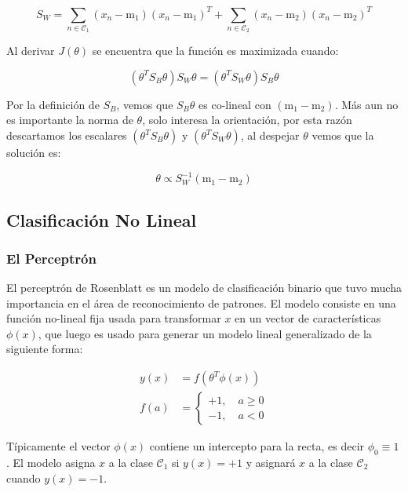 \begin{equation}
    S_W = \sum_{n\in \mathcal{C}_1}(x_n-\text{m}_1)(x_n-\text{m}_1)^T+
    \sum_{n\in \mathcal{C}_2}(x_n-\text{m}_2)(x_n-\text{m}_2)^T
\end{equation}

Al derivar $J(\theta)$ se encuentra que la función es maximizada cuando:

\begin{equation}
    (\theta^TS_B\theta)S_W\theta = (\theta^TS_W\theta)S_B\theta
\end{equation}

Por la definición de $S_B$, vemos que $S_B\theta$ es co-lineal con $(\text{m}_1-\text{m}_2)$. Más aun no es importante la norma de $\theta$, solo interesa la orientación, por esta razón descartamos los escalares $(\theta^TS_B\theta)$ y $(\theta^TS_W\theta)$, al despejar $\theta$ vemos que la solución es:

\begin{equation}
    \theta \propto S_W^{-1}(\text{m}_1-\text{m}_2)
\end{equation}
\newpage
\subsection{Clasificación No Lineal}

\subsubsection{El Perceptrón}

El perceptrón de Rosenblatt es un modelo de clasificación binario que tuvo mucha importancia en el área de reconocimiento de patrones. El modelo consiste en una función no-lineal fija usada para transformar $x$ en un vector de características $\phi(x)$, que luego es usado para generar un modelo lineal generalizado de la siguiente forma:

\begin{align}
    y(x) &= f(\theta^T\phi(x))\\
    f(a) &= \left\{\begin{matrix}
    +1,\quad a\geq 0\\
    -1,\quad a<0
    \end{matrix}\right.
\end{align}

Típicamente el vector $\phi(x)$ contiene un intercepto para la recta, es decir $\phi_0\equiv1$. El modelo asigna $x$ a la clase $\mathcal{C}_1$ si $y(x)=+1$ y asignará $x$ a la clase $\mathcal{C}_2$ cuando $y(x)=-1$.

